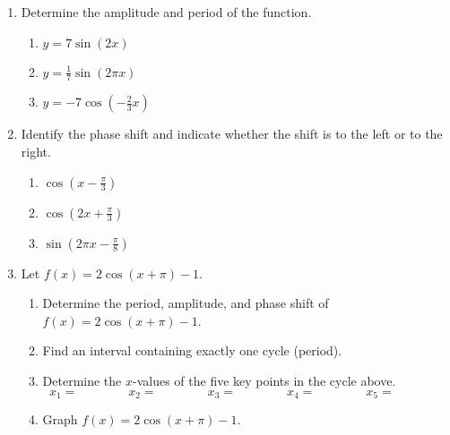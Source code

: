 \begin{enumerate}

\item Determine the amplitude and period of the function.
\begin{enumerate}
\item $y=7\sin(2x)$ \vfill
\item $\displaystyle y=\frac{1}{7}\sin(2\pi x)$ \vfill
\item $\displaystyle y=-7\cos\left(-\frac{2}{3}x\right)$ \vfill
\end{enumerate}

\item Identify the phase shift and indicate whether the shift is to the left or to the right.
\begin{enumerate}
\item $\displaystyle \cos\left(x-\frac{\pi}{3}\right)$\vfill
\item $\displaystyle \cos\left(2x+\frac{\pi}{3}\right)$\vfill
\item $\displaystyle \sin\left(2\pi x -\frac{\pi}{8}\right)$\vfill
\end{enumerate}


\clearpage

\item Let $f(x)=2\cos(x+\pi)-1$.

\begin{enumerate}

\item Determine the period, amplitude, and phase shift of $f(x)=2\cos(x+\pi)-1$.\vfill
\item Find an interval containing exactly one cycle (period).\vfill
\item Determine the $x$-values of the five key points in the cycle above.
$$x_1= \quad \quad \quad \quad x_2= \quad \quad \quad \quad x_3= \quad \quad \quad \quad x_4= \quad \quad \quad \quad x_5= \quad \quad \quad \quad$$
\vfill





\item Graph $f(x)=2\cos(x+\pi)-1$.

  \noindent
{}
\end{enumerate}
\end{enumerate}
